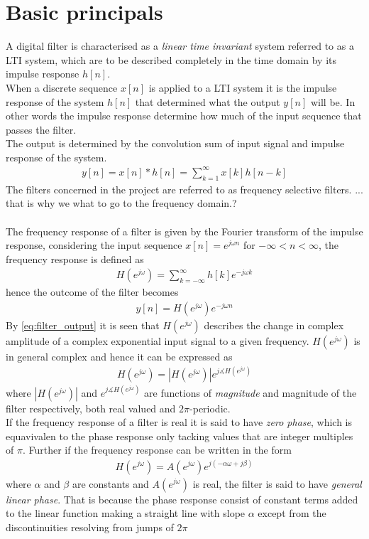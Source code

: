 \section{Basic principals}

A digital filter is characterised as a \textit{linear time invariant} system referred to as a LTI system, which are to be described completely in the time domain by its impulse response $h[n]$. \\
When a discrete sequence $x[n]$ is applied to a LTI system it is the impulse response of the system $h[n]$ that determined what the output $y[n]$ will be. In other words the impulse response determine how much of the input sequence that passes the filter. \\ 
The output is determined by the convolution sum of input signal and impulse response of the system.
\begin{align}
y[n] = x[n]*h[n] = \sum_{k=1}^{\infty} x[k]h[n-k]
\end{align}  
The filters concerned in the project are referred to as frequency selective filters. ... that is why we what to go to the frequency domain.? \\
\\   
The frequency response of a filter is given by the Fourier transform of the impulse response, considering the input sequence $x[n]=e^{j\omega n}$ for $-\infty < n <\infty$, the frequency response is defined as
\begin{align}
H(e^{j\omega})=\sum_{k=-\infty}^{\infty}h[k]e^{-j\omega k}
\end{align}
hence the outcome of the filter becomes 
\begin{align}
y[n]=H(e^{j\omega})e^{-j\omega n} \label{eq:filter_output}
\end{align} 
By \eqref{eq:filter_output} it is seen that $H(e^{j\omega})$ describes the change in complex amplitude of a complex exponential input signal to a given frequency. $H(e^{j\omega})$ is in general complex and hence it can be expressed as
\begin{align}
H(e^{j\omega})=|H(e^{j\omega})|e^{j\measuredangle H(e^{j\omega})}
\end{align}  
where $|H(e^{j\omega})|$ and $e^{j\measuredangle H(e^{j\omega})}$ are functions of \textit{magnitude} and magnitude of the filter respectively, both real valued and $2\pi$-periodic.\\ 
If the frequency response of a filter is real it is said to have \textit{zero phase}, which is equavivalen to the phase response only tacking values that are integer multiples of $\pi$. Further if the frequency response can be written in the form 
\begin{align}
H(e^{j\omega})=A(e^{j\omega})e^{j(-\alpha\omega + j\beta)} 
\end{align}
where $\alpha$ and $\beta$ are constants and $A(e^{j\omega})$ is real,  the filter is said to have \textit{general linear phase}. That is because the phase response consist of constant terms added to the linear function making a straight line with slope $\alpha$ except from the discontinuities resolving from jumps of $2\pi$ \\
\\


